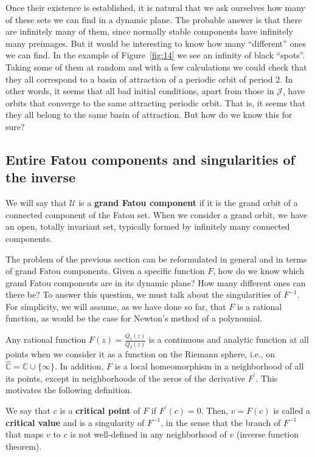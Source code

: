 \documentclass[12pt, a4paper]{article}
\begin{document}
Once their existence is established, it is natural that we ask ourselves how
many of these sets we can find in a dynamic plane. The probable answer is that
there are infinitely many of them, since normally stable components have
infinitely many preimages. But it would be interesting to know how many
``different'' ones we can find. In the example of Figure~\ref{fig:14} we see an
infinity of black ``spots''. Taking some of them at random and with a few
calculations we could check that they all correspond to a basin of attraction of
a periodic orbit of period 2. In other words, it seems that all bad initial
conditions, apart from those in $\mathcal{J}$, have orbits that converge to the
same attracting periodic orbit. That is, it seems that they all belong to the
same basin of attraction. But how do we know this for sure?

\subsection{Entire Fatou components and singularities of the inverse}

We will say that $\mathcal{U}$ is a \textbf{grand Fatou component} if it is the
grand orbit of a connected component of the Fatou set. When we consider a grand
orbit, we have an open, totally invariant set, typically formed by infinitely
many connected components.

The problem of the previous section can be reformulated in general and in terms
of grand Fatou components. Given a specific function $F$, how do we know which
grand Fatou components are in its dynamic plane? How many different ones can
there be? To answer this question, we must talk about the singularities of
$F^{-1}$. For simplicity, we will assume, as we have done so far, that $F$ is a
rational function, as would be the case for Newton's method of a polynomial.

Any rational function $F(z)=\frac{Q_{1}(z)}{Q_{2}(z)}$ is a continuous and
analytic function at all points when we consider it as a function on the Riemann
sphere, i.e., on $\hat{\mathbb{C}}=\mathbb{C}\cup\{\infty\}$. In addition, $F$
is a local homeomorphism in a neighborhood of all its points, except in
neighborhoods of the zeros of the derivative $F^{\prime}$. This motivates the
following definition.

\begin{definition}
We say that $c$ is a \textbf{critical point} of $F$ if $F^{\prime}(c)=0$. Then,
$v=F(c)$ is called a \textbf{critical value} and is a singularity of $F^{-1}$,
in the sense that the branch of $F^{-1}$ that maps $v$ to $c$ is not
well-defined in any neighborhood of $v$ (inverse function theorem).
\end{definition}
\end{document}
